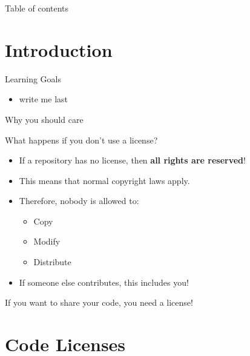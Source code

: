 \documentclass[compress,aspectratio=169]{beamer}
\begin{document}
	\begin{frame}[plain]
		\titlepage
	\end{frame}

	\begin{frame}[t]{Table of contents}
		\tableofcontents[subsectionstyle=hide/hide]
	\end{frame}


	\section{Introduction}

	\begin{frame}{Learning Goals}
		\begin{itemize}
			\item write me last
		\end{itemize}
	\end{frame}

	\begin{frame}{Why you should care}
    \begin{block}{What happens if you don't use a license? \cite{nolicense}}
      \begin{itemize}
        \item If a repository has no license, then \textbf{all rights are reserved}!
        \item This means that normal copyright laws apply.
        \item Therefore, nobody is allowed to:
          \begin{itemize}
            \item Copy
            \item Modify
            \item Distribute
          \end{itemize}
        \item If someone else contributes, this includes you!
      \end{itemize}
    \end{block}
    \begin{center}
      \Large If you want to share your code, you need a license!
    \end{center}
	\end{frame}

  \section{Code Licenses}
\end{document}
